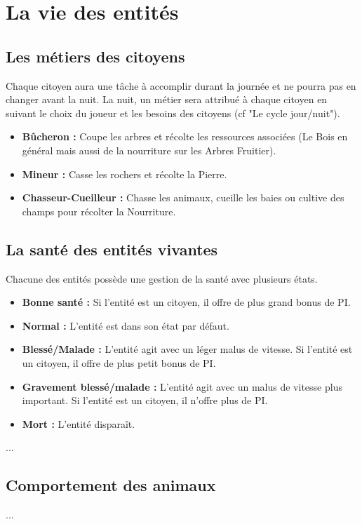 \documentclass[a4paper]{article}
\begin{document}
\section*{La vie des entités}

\subsection*{Les métiers des citoyens}
Chaque citoyen aura une tâche à accomplir durant la journée et ne pourra pas en changer avant la nuit. La nuit, un métier sera attribué à chaque citoyen en suivant le choix du joueur et les besoins des citoyens (cf "Le cycle jour/nuit").
\begin{itemize}
\item \textbf{Bûcheron :} \small{ Coupe les arbres et récolte les ressources associées (Le Bois en général mais aussi de la nourriture sur les Arbres Fruitier).}
\item \textbf{Mineur :} \small{ Casse les rochers et récolte la Pierre.}
\item \textbf{Chasseur-Cueilleur :} \small{ Chasse les animaux, cueille les baies ou cultive des champs pour récolter la Nourriture.}
\end{itemize}

\subsection*{La santé des entités vivantes}
Chacune des entités possède une gestion de la santé avec plusieurs états.
\begin{itemize}
\item \textbf{Bonne santé :} \small{ Si l'entité est un citoyen, il offre de plus grand bonus de PI.}
\item \textbf{Normal :} \small{ L'entité est dans son état par défaut.}
\item \textbf{Blessé/Malade :} \small{ L'entité agit avec un léger malus de vitesse. Si l'entité est un citoyen, il offre de plus petit bonus de PI.}
\item \textbf{Gravement blessé/malade :} \small{ L'entité agit avec un malus de vitesse plus important. Si l'entité est un citoyen, il n'offre plus de PI.}
\item \textbf{Mort :} \small{ L'entité disparaît.}
\end{itemize}

...

\subsection*{Comportement des animaux}
...
\end{document}
